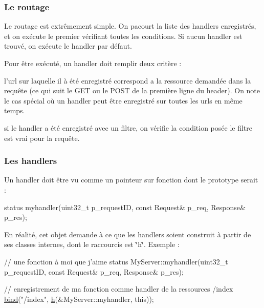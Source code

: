 \par
 \subsubsection*{Le routage }

Le routage est extrêmement simple. On pacourt la liste des handlers enregistrés, et on exécute le premier vérifiant toutes les conditions. Si aucun handler est trouvé, on exécute le handler par défaut.

Pour être exécuté, un handler doit remplir deux critère \-:
\begin{DoxyItemize}
\item l'url sur laquelle il à été enregistré correspond a la ressource demandée dans la requête (ce qui suit le G\-E\-T ou le P\-O\-S\-T de la première ligne du header). On note le cas spécial où un handler peut être enregistré sur toutes les urls en même temps.
\item si le handler a été enregistré avec un filtre, on vérifie la condition posée le filtre est vrai pour la requête.
\end{DoxyItemize}

\par
 \subsubsection*{Les handlers }

Un handler doit être vu comme un pointeur sur fonction dont le prototype serait \-: 
\begin{DoxyCode}
status myhandler(uint32\_t p\_requestID, \textcolor{keyword}{const} Request& p\_req, Response& p\_res);
\end{DoxyCode}


En réalité, cet objet demande à ce que les handlers soient construit à partir de ses classes internes, dont le raccourcis est \char`\"{}h\char`\"{}. Exemple \-: 
\begin{DoxyCode}
\textcolor{comment}{// une fonction à moi que j'aime}
status MyServer::myhandler(uint32\_t p\_requestID, \textcolor{keyword}{const} Request& p\_req, Response& p\_res);

\textcolor{comment}{// enregistrement de ma fonction comme handler de la ressources /index}
\hyperlink{classxtd_1_1network_1_1http_1_1Server_a7281ae7cdda6d7b2334b27e530ce000f}{bind}(\textcolor{stringliteral}{"/index"}, \hyperlink{classxtd_1_1network_1_1http_1_1Server_adfa2951649119f630d33ce9083bd989c}{h}(&MyServer::myhandler, \textcolor{keyword}{this}));
\end{DoxyCode}


